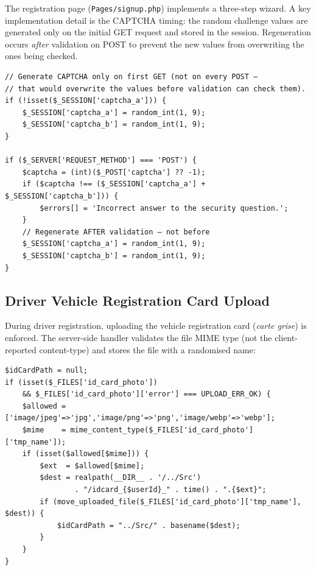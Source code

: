 \documentclass[12pt,a4paper,openright]{report}
\begin{document}
The registration page (\texttt{Pages/signup.php}) implements a three-step wizard. A key implementation detail is the CAPTCHA timing: the random challenge values are generated only on the initial GET request and stored in the session. Regeneration occurs \textit{after} validation on POST to prevent the new values from overwriting the ones being checked.

\begin{lstlisting}[style=phpstyle, caption={CAPTCHA Timing Fix --- Generate on GET Only}]
// Generate CAPTCHA only on first GET (not on every POST —
// that would overwrite the values before validation can check them).
if (!isset($_SESSION['captcha_a'])) {
    $_SESSION['captcha_a'] = random_int(1, 9);
    $_SESSION['captcha_b'] = random_int(1, 9);
}

if ($_SERVER['REQUEST_METHOD'] === 'POST') {
    $captcha = (int)($_POST['captcha'] ?? -1);
    if ($captcha !== ($_SESSION['captcha_a'] + $_SESSION['captcha_b'])) {
        $errors[] = 'Incorrect answer to the security question.';
    }
    // Regenerate AFTER validation — not before
    $_SESSION['captcha_a'] = random_int(1, 9);
    $_SESSION['captcha_b'] = random_int(1, 9);
}
\end{lstlisting}

\subsection{Driver Vehicle Registration Card Upload}

During driver registration, uploading the vehicle registration card (\textit{carte grise}) is enforced. The server-side handler validates the file MIME type (not the client-reported content-type) and stores the file with a randomised name:

\begin{lstlisting}[style=phpstyle, caption={Carte Grise Upload Handler}]
$idCardPath = null;
if (isset($_FILES['id_card_photo'])
    && $_FILES['id_card_photo']['error'] === UPLOAD_ERR_OK) {
    $allowed = ['image/jpeg'=>'jpg','image/png'=>'png','image/webp'=>'webp'];
    $mime    = mime_content_type($_FILES['id_card_photo']['tmp_name']);
    if (isset($allowed[$mime])) {
        $ext  = $allowed[$mime];
        $dest = realpath(__DIR__ . '/../Src')
                . "/idcard_{$userId}_" . time() . ".{$ext}";
        if (move_uploaded_file($_FILES['id_card_photo']['tmp_name'], $dest)) {
            $idCardPath = "../Src/" . basename($dest);
        }
    }
}
\end{lstlisting}
\end{document}
